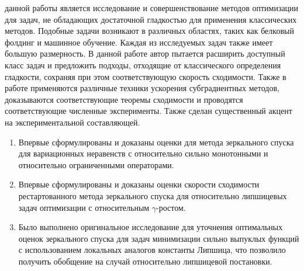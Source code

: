   \begin{table}[h]
    \caption{Сравнение характеристик методов}
    \label{tabular:timesandtenses}
    \centering
\end{table}


{\aim} данной работы является исследование и совершенствование методов оптимизации для задач, не обладающих достаточной гладкостью для применения классических методов. Подобные задачи возникают в различных областях, таких как белковый фолдинг и машинное обучение. Каждая из исследуемых задач также имеет большую размерность. В данной работе автор пытается расширить доступный класс задач и предложить подходы, отходящие от классического определения гладкости, сохраняя при этом соответствующую скорость сходимости. Также в работе применяются различные техники ускорения субградиентных методов, доказываются соответствующие теоремы сходимости и проводятся соответствующие численные эксперименты. Также сделан существенный акцент на экспериментальной составляющей. 

{\novelty}
\begin{enumerate}[beginpenalty=10000] %
  \item Впервые сформулированы и доказаны оценки для метода зеркального спуска для вариационных неравенств с относительно сильно монотонными и относительно ограниченными операторами.
  \item Впервые сформулированы и доказаны оценки скорости сходимости рестартованного метода зеркального спуска для относительно липшицевых задач оптимизации с относительным $\gamma$-ростом.
  \item Было выполнено оригинальное исследование для уточнения оптимальных оценок зеркального спуска для задач минимизации сильно выпуклых функций с использованием локальных аналогов константы Липшица, что позволило получить обобщение на случай относительно липшицевой постановки. 
\end{enumerate}

